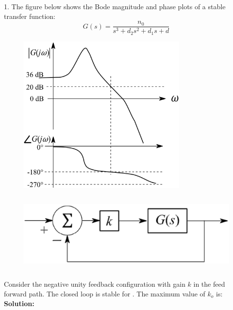 \begin{enumerate}[label=\thesection.\arabic*.,ref=\thesection.\theenumi]
1. The figure below shows the Bode magnitude and phase plots of a stable transfer function:
\begin{equation}  
            G(s) = \frac{n_0}{s^3 + d_2 s^2 + d_1 s + d}
\end{equation}
\begin{figure}[h]

    \includegraphics[width=1\linewidth, height=8cm]{./figs/q42_1.eps}
 
\end{figure}
\begin{figure}[h]
    \centering
    \includegraphics[width=1\linewidth, height=4cm ]{./figs/q42.eps}

\end{figure}
 Consider the negative unity feedback configuration with gain $k$ in the feed forward path. The closed loop is stable for  . 
    The maximum value of $k_o$  is: \\


\textbf{ Solution:}


\end{enumerate}

